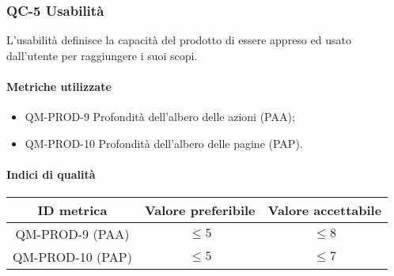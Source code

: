 \subsubsection{QC-5 Usabilità}
L'usabilità definisce la capacità del prodotto di essere appreso ed usato dall'utente per raggiungere i suoi scopi.

	\paragraph{Metriche utilizzate}
	\begin{itemize}
		\item QM-PROD-9 Profondità dell'albero delle azioni (PAA);
		\item QM-PROD-10 Profondità dell'albero delle pagine (PAP).
	\end{itemize}

	\paragraph{Indici di qualità}
	\begin{center}
		\begin{tabular}{|c|c|c|}
			\rowcolor{lighter-grayer}
			\hline
			\textbf{ID metrica} & \textbf{Valore preferibile} & \textbf{Valore accettabile} \\
			\hline
			QM-PROD-9 (PAA) & \(\le 5\) & \(\le 8\) \\
			\hline
			QM-PROD-10 (PAP) & \(\le 5\) & \(\le 7\) \\
			\hline
		\end{tabular}
	\end{center}
